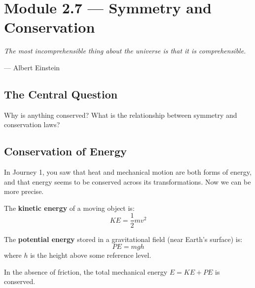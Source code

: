 \documentclass[12pt, a4paper, twoside]{book}
\theoremstyle{disc}
\begin{document}
\setcounter{chapter}{1}
\setcounter{section}{6}

\section{Module 2.7 — Symmetry and Conservation}
\label{sec:symmetry_conservation}

\epigraph{
  \itshape The most incomprehensible thing about the universe is that it is comprehensible.
}{--- Albert Einstein}

\subsection{The Central Question}

\begin{tcolorbox}[colback=deep!5, colframe=deep, fontupper=\large\bfseries\color{deep}]
Why is anything conserved? What is the relationship between symmetry and conservation laws?
\end{tcolorbox}

\subsection{Conservation of Energy}

In Journey 1, you saw that heat and mechanical motion are both forms of energy, and that energy seems to be conserved across its transformations. Now we can be more precise.

The \textbf{kinetic energy} of a moving object is:
\begin{equation}
  KE = \frac{1}{2}mv^2
\end{equation}

The \textbf{potential energy} stored in a gravitational field (near Earth's surface) is:
\begin{equation}
  PE = mgh
\end{equation}
where $h$ is the height above some reference level.

In the absence of friction, the total mechanical energy $E = KE + PE$ is conserved.
\end{document}
